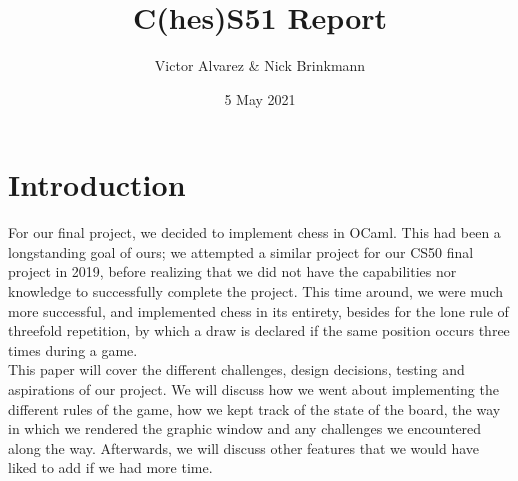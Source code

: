 \documentclass{article}
\title{C(hes)S51 Report}
\author{Victor Alvarez \& Nick Brinkmann}
\date{5 May 2021}
\begin{document}
\maketitle

\section{Introduction}
For our final project, we decided to implement chess in OCaml. This had been a longstanding goal of ours; we attempted a similar project for our CS50 final project in 2019, before realizing that we did not have the capabilities nor knowledge to successfully complete the project. This time around, we were much more successful, and implemented chess in its entirety, besides for the lone rule of threefold repetition, by which a draw is declared if the same position occurs three times during a game.
\\
This paper will cover the different challenges, design decisions, testing and aspirations of our project. We will discuss how we went about implementing the different rules of the game, how we kept track of the state of the board, the way in which we rendered the graphic window and any challenges we encountered along the way. Afterwards, we will discuss other features that we would have liked to add if we had more time. 
\end{document}
